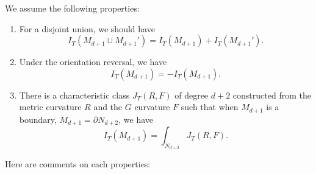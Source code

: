 \documentclass[12pt]{article}
\numberwithin{equation}{section}
\numberwithin{figure}{section}
\theoremstyle{remark}
\begin{document}
We assume the following properties:
\begin{enumerate}
\item For a disjoint union, we should have
\begin{equation}
I_T(M_{d+1}\sqcup M_{d+1}')=I_T(M_{d+1})+ I_T(M_{d+1}').
\end{equation}
\item Under the orientation reversal, we have 
\begin{equation}
I_T(\overline{M_{d+1}})=-I_T(M_{d+1}).
\end{equation}
\item There is a characteristic class $J_T(R,F)$ of degree $d+2$ constructed from
the metric curvature $R$ and the $G$ curvature $F$ such that 
when  $M_{d+1}$ is a boundary, $M_{d+1}=\partial N_{d+2}$,
we have \begin{equation}
I_T(M_{d+1}) = \int_{N_{d+2}} J_T(R,F).
\end{equation}
\end{enumerate}
Here are comments on each properties:
\end{document}
